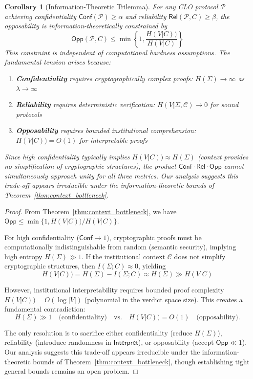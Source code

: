 \documentclass{ieeeaccess}
\newtheorem{corollary}{Corollary}[subsection]
\newtheorem{proof}{Proof}[section]
\begin{document}
\begin{corollary}[Information-Theoretic Trilemma]\label{cor:trilemma}
For any CLO protocol $\mathcal{P}$ achieving confidentiality $\mathsf{Conf}(\mathcal{P}) \geq \alpha$ and reliability $\mathsf{Rel}(\mathcal{P}, C) \geq \beta$, the opposability is information-theoretically constrained by
\begin{equation}
\mathsf{Opp}(\mathcal{P}, C) \leq \min\left\{1, \frac{H(V|C))}{H(V|C)}\right\}
\end{equation}
This constraint is independent of computational hardness assumptions. The fundamental tension arises because:
\begin{enumerate}
\item \textbf{Confidentiality} requires cryptographically complex proofs: $H(\Sigma) \to \infty$ as $\lambda \to \infty$
\item \textbf{Reliability} requires deterministic verification: $H(V|\Sigma, \mathcal{C}) \to 0$ for sound protocols
\item \textbf{Opposability} requires bounded institutional comprehension: $H(V|C)) = O(1)$ for interpretable proofs
\end{enumerate}
Since high confidentiality typically implies $H(V|C)) \approx H(\Sigma)$ (context provides no simplification of cryptographic structures), the product $\mathsf{Conf} \cdot \mathsf{Rel} \cdot \mathsf{Opp}$ cannot simultaneously approach unity for all three metrics.  Our analysis suggests this trade-off appears irreducible under the information-theoretic bounds of Theorem~\ref{thm:context_bottleneck}.
\end{corollary}


\begin{proof}
From Theorem~\ref{thm:context_bottleneck}, we have $\mathsf{Opp} \leq \min\{1, H(V|C))/H(V|C)\}$.

For high confidentiality ($\mathsf{Conf} \to 1$), cryptographic proofs must be computationally indistinguishable from random (semantic security), implying high entropy $H(\Sigma) \gg 1$. If the institutional context $\mathcal{C}$ does not simplify cryptographic structures, then $I(\Sigma;C) \approx 0$, yielding
\begin{equation}
H(V|C)) = H(\Sigma) - I(\Sigma;C) \approx H(\Sigma) \gg H(V|C)
\end{equation}

However, institutional interpretability requires bounded proof complexity $H(V|C)) = O(\log |V|)$ (polynomial in the verdict space size). This creates a fundamental contradiction:
\begin{equation}
H(\Sigma) \gg 1 \quad \text{(confidentiality)} \quad \text{vs.} \quad H(V|C)) = O(1) \quad \text{(opposability)}.
\end{equation}

The only resolution is to sacrifice either confidentiality (reduce $H(\Sigma)$), reliability (introduce randomness in $\mathsf{Interpret}$), or opposability (accept $\mathsf{Opp} \ll 1$). Our analysis suggests this trade-off appears 
irreducible under the information-theoretic bounds of Theorem~\ref{thm:context_bottleneck}, though establishing tight general bounds 
remains an open problem.
\end{proof}
\end{document}
